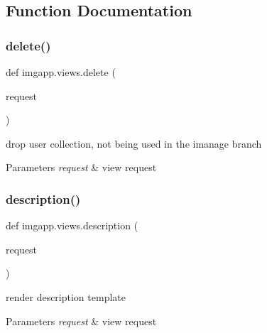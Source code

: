 \subsection{Function Documentation}
\mbox{\label{namespaceimgapp_1_1views_ad231247785394cfcbefcf27970310f64}} 
\subsubsection{\texorpdfstring{delete()}{delete()}}
{\footnotesize\ttfamily def imgapp.\+views.\+delete (\begin{DoxyParamCaption}\item[{}]{request }\end{DoxyParamCaption})}



drop user collection, not being used in the imanage branch 


\begin{DoxyParams}{Parameters}
{\em request} & view request \\
\hline
\end{DoxyParams}
\mbox{\label{namespaceimgapp_1_1views_aad5f229f777ab6368cc67dab4436b8ac}} 
\subsubsection{\texorpdfstring{description()}{description()}}
{\footnotesize\ttfamily def imgapp.\+views.\+description (\begin{DoxyParamCaption}\item[{}]{request }\end{DoxyParamCaption})}



render description template 


\begin{DoxyParams}{Parameters}
{\em request} & view request \\
\hline
\end{DoxyParams}
\mbox{\label{namespaceimgapp_1_1views_adcf4ad535b76cf41f5894ad57bcdbc43}} 
